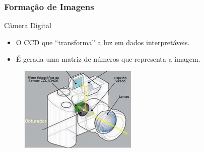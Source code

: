 \documentclass{beamer}
\begin{document}
\begin{frame}
\frametitle{Formação de Imagens}

	\begin{block}{Câmera Digital}
		\begin{itemize}
			\item O CCD que ``transforma'' a luz em dados interpretáveis.
			\item É gerada uma matriz de números que representa a imagem.
		\end{itemize}
	\end{block}
	
	\begin{figure}[htb!]
  		\centering
      		\includegraphics[width=0.5\textwidth]{Figures/cameraDigital}
  		\label{iep}
	\end{figure}

\end{frame}
\end{document}
